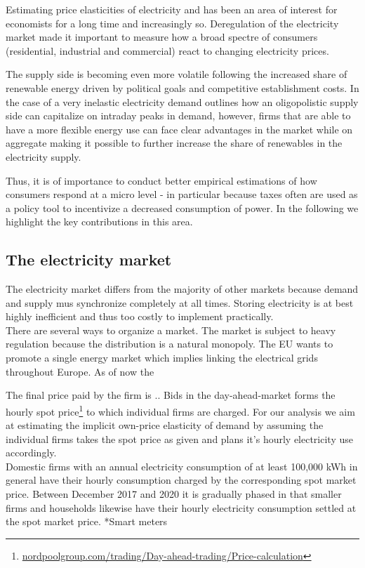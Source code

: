 \label{sec:background}
Estimating price elasticities of electricity and has been an area of interest for economists for a long time and increasingly so. Deregulation of the electricity market made it important to measure how a broad spectre of consumers (residential, industrial and commercial) react to changing electricity prices.\par
The supply side is becoming even more volatile following the increased share of renewable energy driven by political goals and competitive establishment costs. In the case of a very inelastic electricity demand \citet{wolak2001impact} outlines how an oligopolistic supply side can capitalize on intraday peaks in demand, however, firms that are able to have a more flexible energy use can face clear advantages in the market while on aggregate making it possible to further increase the share of renewables in the electricity supply. \par
Thus, it is of importance to conduct better empirical estimations of how consumers respond at a micro level - in particular because taxes often are used as a policy tool to incentivize a decreased consumption of power. In the following we highlight the key contributions in this area.

\subsection{The electricity market}
\label{subsec:b_market}
The electricity market differs from the majority of other markets because demand and supply mus synchronize completely at all times. Storing electricity is at best highly inefficient and thus too costly to implement practically. 
\medskip\\
There are several ways to organize a market. The market is subject to heavy regulation because the distribution is a natural monopoly. The EU wants to promote a single energy market which implies linking the electrical grids throughout Europe. As of now the 

The final price paid by the firm is .. 
Bids in the day-ahead-market forms the hourly spot price\footnote{\url{nordpoolgroup.com/trading/Day-ahead-trading/Price-calculation}} to which individual firms are charged. For our analysis we aim at estimating the implicit own-price elasticity of demand by assuming the individual firms takes the spot price as given and plans it's hourly electricity use accordingly.
\medskip\\
Domestic firms with an annual electricity consumption of at least 100,000 kWh in general have their hourly consumption charged by the corresponding spot market price. Between December 2017 and 2020 it is gradually phased in that
smaller firms and households likewise have their hourly electricity consumption settled at the spot market price.
*Smart meters

